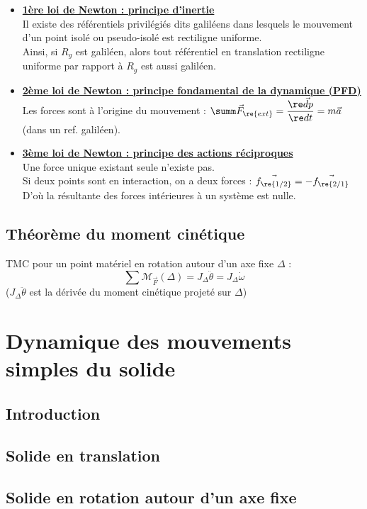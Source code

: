 \documentclass[13pt, twoside, a4paper, french]{report}
\begin{document}
                \begin{itemize}
                    \item \underline{\textbf{1ère loi de Newton : principe d’inertie}}\\
                    Il existe des référentiels privilégiés dits galiléens dans lesquels le mouvement d'un point isolé ou pseudo-isolé est rectiligne uniforme.\\
                    Ainsi, si $R_g$ est galiléen, alors tout référentiel en translation rectiligne uniforme par rapport à $R_g$ est aussi galiléen.\\

                    \item \underline{\textbf{2ème loi de Newton : principe fondamental de la dynamique (PFD)}}\\
                    Les forces sont à l’origine du mouvement : $\summ \vec F_\re{ext} = \dfrac{\re \vec d p}{\re d t} = m \vec a$ (dans un ref. galiléen).\\

                    \item \underline{\textbf{3ème loi de Newton : principe des actions réciproques}}\\
                    Une force unique existant seule n'existe pas.\\
                    Si deux points sont en interaction, on a deux forces : $\vec{f_\re{1/2}} = - \vec{f_\re{2/1}}$\\
                    D'où la résultante des forces intérieures à un système est nulle.
                \end{itemize}

            \subsection{Théorème du moment cinétique}\label{subsec:theoreme-du-moment-cinetique}

                TMC pour un point matériel en rotation autour d'un axe fixe $\Delta$ :
                \[\sum \mathcal{M}_{\vec F} (\Delta) = J_\Delta \ddot \theta = J_\Delta \dot \omega \]
                ($J_\Delta \ddot \theta$ est la dérivée du moment cinétique projeté sur $\Delta$)\\

        \section{Dynamique des mouvements simples du solide}\label{sec:dynamique-des-mouvements-simples-du-solide}

            \subsection{Introduction}\label{subsec:introduction}

            \subsection{Solide en translation}\label{subsec:solide-en-translation}

            \subsection{Solide en rotation autour d'un axe fixe}\label{subsec:solide-en-rotation-autour-d'un-axe-fixe}
\end{document}
